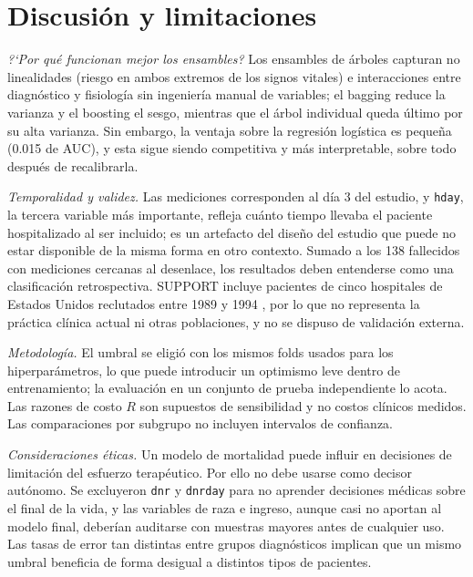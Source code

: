 \documentclass[conference]{IEEEtran}
\begin{document}
\section{Discusión y limitaciones}
\textit{?`Por qué funcionan mejor los ensambles?} Los ensambles de árboles capturan no linealidades (riesgo en ambos extremos de los signos vitales) e interacciones entre diagnóstico y fisiología sin ingeniería manual de variables; el bagging reduce la varianza y el boosting el sesgo, mientras que el árbol individual queda último por su alta varianza. Sin embargo, la ventaja sobre la regresión logística es pequeña (0.015 de AUC), y esta sigue siendo competitiva y más interpretable, sobre todo después de recalibrarla.

\textit{Temporalidad y validez.} Las mediciones corresponden al día 3 del estudio, y \texttt{hday}, la tercera variable más importante, refleja cuánto tiempo llevaba el paciente hospitalizado al ser incluido; es un artefacto del diseño del estudio que puede no estar disponible de la misma forma en otro contexto. Sumado a los 138 fallecidos con mediciones cercanas al desenlace, los resultados deben entenderse como una clasificación retrospectiva. SUPPORT incluye pacientes de cinco hospitales de Estados Unidos reclutados entre 1989 y 1994 \cite{knaus1995}, por lo que no representa la práctica clínica actual ni otras poblaciones, y no se dispuso de validación externa.

\textit{Metodología.} El umbral se eligió con los mismos folds usados para los hiperparámetros, lo que puede introducir un optimismo leve dentro de entrenamiento; la evaluación en un conjunto de prueba independiente lo acota. Las razones de costo $R$ son supuestos de sensibilidad y no costos clínicos medidos. Las comparaciones por subgrupo no incluyen intervalos de confianza.

\textit{Consideraciones éticas.} Un modelo de mortalidad puede influir en decisiones de limitación del esfuerzo terapéutico. Por ello no debe usarse como decisor autónomo. Se excluyeron \texttt{dnr} y \texttt{dnrday} para no aprender decisiones médicas sobre el final de la vida, y las variables de raza e ingreso, aunque casi no aportan al modelo final, deberían auditarse con muestras mayores antes de cualquier uso. Las tasas de error tan distintas entre grupos diagnósticos implican que un mismo umbral beneficia de forma desigual a distintos tipos de pacientes.
\end{document}
